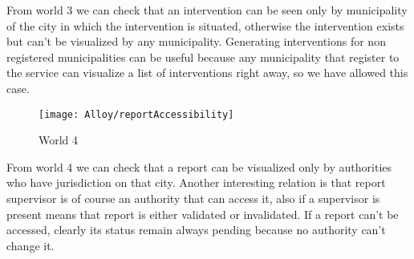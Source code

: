 From world 3 we can check that an intervention can be seen only by municipality of the city in which the intervention is situated, otherwise the intervention exists but can't be visualized by any municipality. Generating interventions for non registered municipalities can be useful because any municipality that register to the service can visualize a list of interventions right away, so we have allowed this case.

\begin{figure}[H]
	\centering
	\texttt{[image: Alloy/reportAccessibility]}
	\caption{World 4}
\end{figure}

From world 4 we can check that a report can be visualized only by authorities who have jurisdiction on that city. Another interesting relation is that report supervisor is of course an authority that can access it, also if a supervisor is present means that report is either validated or invalidated. If a report can't be accessed, clearly its status remain always pending because no authority can't change it.
